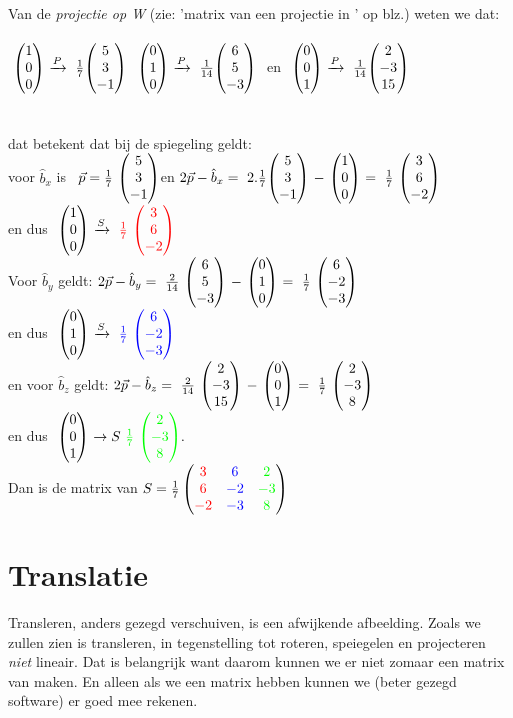 \documentclass[hidelinks, a4wide, 12pt,  twoside]{book}
\begin{document}
 \\ 

Van de \textit{projectie op W}  (zie:  'matrix van een projectie in \RD' op blz.\pageref{projectieR3}) weten we dat:\\ \\
$ \ \vecdrie{1}{0}{0}   \  \xrightarrow{P}  \  \frac{1}{7}\vecdrie {5 } {3}{-1} $
\quad   $ \ \vecdrie{0}{1}{0}   \  \xrightarrow{P}  \ \frac{1}{14}  \vecdrie{ 6 }{5 }{-3 }\ $ 
en \quad  
$  \ \vecdrie{0}{0}{1}   \  \xrightarrow{P}  \  \frac{1}{14}  \vecdrie{2 }{-3 }{15}\ $\\ \\ \\
dat betekent dat bij de spiegeling geldt:\\
voor $ \hat{b}_x $ is \  
$\vec{p} =  \frac{1}{7} \ \vecdrie {5 } {3}{-1} $\quad  en \quad 
$ 2\vec{p}  -  \hat{b}_x  = 
\ 2 . \frac{1}{7} \vecdrie {5 } {3}{-1} \  - \  \vecdrie{1}{0}{0}  \ =
\   \frac{1}{7} \ \vecdrie {3 } {6}{-2} $ \\en dus 
$ \ \vecdrie{1}{0}{0}   \  \xrightarrow{S}  \  { \color{red}\frac{1}{7}} \  \vecdrie[red] {3 } {6}{-2} $\\
Voor $ \hat{b}_y  $ geldt:
$ 2\vec{p}  -  \hat{b}_y  =  
\ \frac{2}{14} \ \vecdrie {6 } {5}{-3} \  - \  \vecdrie{0}{1}{0}  \ = 
\   \frac{1}{7} \ \vecdrie {6 } {-2}{-3} $  \\ en dus  \quad 
$ \ \vecdrie{0}{1}{0}   \  \xrightarrow{S}  \  { \color{blue}\frac{1}{7}} \  \vecdrie[blue] {6 } {-2}{-3} $\\
en voor $ \hat{b}_z  $ geldt:
$ 2\vec{p}  -  \hat{b}_z  =  
\ \frac{2}{14} \ \vecdrie {2 } {-3}{15} \  - \  \vecdrie{0}{0}{1}  \ = 
\   \frac{1}{7} \ \vecdrie {2 } {-3}{8} $   \\ en dus 
$ \ \vecdrie{0}{0}{1}   \  \rightarrow{S}  \  { \color{green}\frac{1}{7}} \  \vecdrie[green] {2} {-3}{8}. $\\
Dan is de matrix van 
$ S = 
\frac{1}{7} \begin{pmatrix}   {\color{red}3} &  {\color{blue}6} &   {\color{green}2}  \\    {\color{red}6}   &   {\color{blue}-2} &  {\color{green}-3}  \\   {\color{red}-2} &   {\color{blue}-3}  &   {\color{green}8} \end{pmatrix} $

\section{Translatie}		
Transleren, anders gezegd verschuiven, is een afwijkende afbeelding. Zoals we zullen zien is transleren, in tegenstelling tot roteren, speiegelen en projecteren \textit{niet} lineair. Dat is belangrijk want daarom kunnen we er niet zomaar een matrix van maken. En alleen als we een matrix hebben kunnen we (beter gezegd software) er  goed mee rekenen. 
\end{document}
